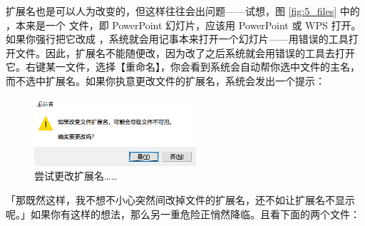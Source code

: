 扩展名也是可以人为改变的，但这样往往会出问题——试想，图 \ref{fig:5_files} 中的 ，本来是一个  文件，即 PowerPoint 幻灯片，应该用 PowerPoint 或 WPS 打开。如果你强行把它改成 ，系统就会用记事本来打开一个幻灯片——用错误的工具打开文件。因此，扩展名不能随便改，因为改了之后系统就会用错误的工具去打开它。右键某一文件，选择【重命名】，你会看到系统会自动帮你选中文件的主名，而不选中扩展名。如果你执意更改文件的扩展名，系统会发出一个提示：

\begin{figure}[htb!]
  \centering
  \includegraphics[width=6cm]{assets/basic/Warning_when_changing_extension.png}
  \caption{尝试更改扩展名……}
  \label{fig:Warning_when_changing_extension}
\end{figure}

「那既然这样，我不想不小心突然间改掉文件的扩展名，还不如让扩展名不显示呢。」如果你有这样的想法，那么另一重危险正悄然降临。且看下面的两个文件：

